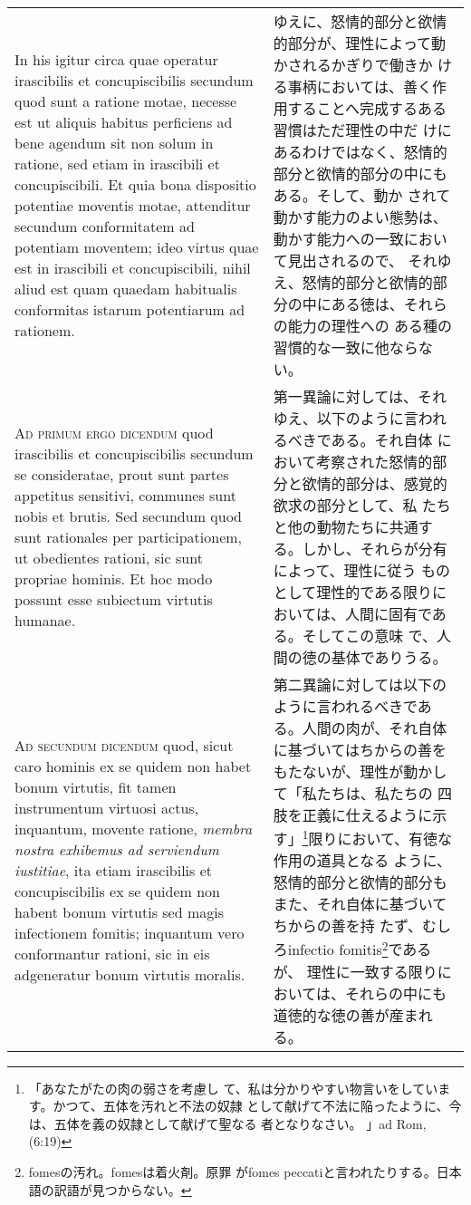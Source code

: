 \documentclass[10pt]{jsarticle}
\begin{document}
\begin{longtable}{p{21em}p{21em}}
\\

In his igitur circa quae operatur irascibilis et concupiscibilis
secundum quod sunt a ratione motae, necesse est ut aliquis habitus
perficiens ad bene agendum sit non solum in ratione, sed etiam in
irascibili et concupiscibili. Et quia bona dispositio potentiae
moventis motae, attenditur secundum conformitatem ad potentiam
moventem; ideo virtus quae est in irascibili et concupiscibili, nihil
aliud est quam quaedam habitualis conformitas istarum potentiarum ad
rationem.

&

ゆえに、怒情的部分と欲情的部分が、理性によって動かされるかぎりで働きか
ける事柄においては、善く作用することへ完成するある習慣はただ理性の中だ
けにあるわけではなく、怒情的部分と欲情的部分の中にもある。そして、動か
されて動かす能力のよい態勢は、動かす能力への一致において見出されるので、
それゆえ、怒情的部分と欲情的部分の中にある徳は、それらの能力の理性への
ある種の習慣的な一致に他ならない。

\\

{\scshape Ad primum ergo dicendum} quod irascibilis et concupiscibilis
secundum se consideratae, prout sunt partes appetitus sensitivi,
communes sunt nobis et brutis. Sed secundum quod sunt rationales per
participationem, ut obedientes rationi, sic sunt propriae hominis. Et
hoc modo possunt esse subiectum virtutis humanae.

&

第一異論に対しては、それゆえ、以下のように言われるべきである。それ自体
において考察された怒情的部分と欲情的部分は、感覚的欲求の部分として、私
たちと他の動物たちに共通する。しかし、それらが分有によって、理性に従う
ものとして理性的である限りにおいては、人間に固有である。そしてこの意味
で、人間の徳の基体でありうる。

\\

{\scshape Ad secundum dicendum} quod, sicut caro hominis ex se quidem
non habet bonum virtutis, fit tamen instrumentum virtuosi actus,
inquantum, movente ratione, {\itshape membra nostra exhibemus ad
serviendum iustitiae}, ita etiam irascibilis et concupiscibilis ex se
quidem non habent bonum virtutis sed magis infectionem fomitis;
inquantum vero conformantur rationi, sic in eis adgeneratur bonum
virtutis moralis.

&

第二異論に対しては以下のように言われるべきである。人間の肉が、それ自体
に基づいてはちからの善をもたないが、理性が動かして「私たちは、私たちの
四肢を正義に仕えるように示す」\footnote{「あなたがたの肉の弱さを考慮し
て、私は分かりやすい物言いをしています。かつて、五体を汚れと不法の奴隷
として献げて不法に陥ったように、今は、五体を義の奴隷として献げて聖なる
者となりなさい。 」ad Rom, (6:19)}限りにおいて、有徳な作用の道具となる
ように、怒情的部分と欲情的部分もまた、それ自体に基づいてちからの善を持
たず、むしろinfectio fomitis\footnote{fomesの汚れ。fomesは着火剤。原罪
がfomes peccatiと言われたりする。日本語の訳語が見つからない。}であるが、
理性に一致する限りにおいては、それらの中にも道徳的な徳の善が産まれる。


\end{longtable}
\end{document}

